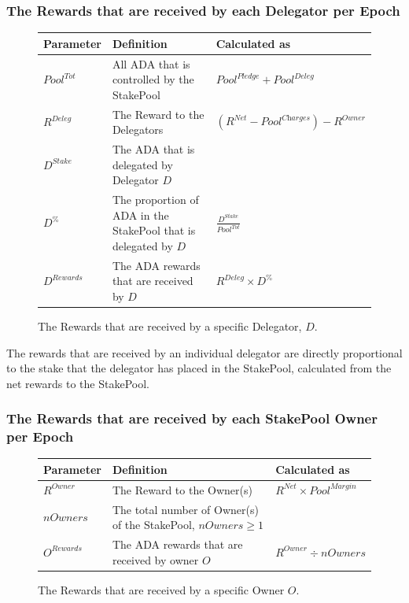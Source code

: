 \documentclass[11pt,a4paper,dvipsnames,twosided,final]{article}
\newcommand{\ada}{ADA{}}
\begin{document}
\subsubsection*{The Rewards that are received by each Delegator per Epoch}

\begin{figure}[h!]
\begin{center}
\begin{tabular}{||l|p{9cm}|l||}
  \hline \hline
\textbf{Parameter} & \textbf{Definition} & \textbf{Calculated as} \\\hline
${\textit{Pool}}^{Tot}$ & All \ada{} that is controlled by the StakePool & ${\textit{Pool}}^\textit{Pledge} + {\textit{Pool}}^\textit{Deleg}$ \\\hline
$R^{Deleg}$ & The Reward to the Delegators & $(R^{\textit{Net}}-\textit{Pool}^{\textit{Charges}}) - R^{Owner}$ \\\hline
$D^{Stake}$ & The \ada{} that is delegated by Delegator $D$ & \\\hline
$D^\%$ & The proportion of \ada{} in the StakePool that is delegated by $D$ & $\frac{D^{Stake}}{Pool^{Tot}}$ \\\hline
$D^{Rewards}$ & The \ada{} rewards that are received by $D$ & $R^{\textit{Deleg}} \times D^\%$ \\\hline
\hline
\end{tabular}
\end{center}
\caption{The Rewards that are received by a specific Delegator, $D$.}
\end{figure}

\noindent
The rewards that are received by an individual delegator are directly proportional to the
stake that the delegator has placed in the StakePool, calculated from the net rewards to the
StakePool.

\clearpage
\subsubsection*{The Rewards that are received by each StakePool Owner per Epoch}

\begin{figure}[h!]
\begin{center}
\begin{tabular}{||l|p{6cm}|l||}
  \hline \hline
\textbf{Parameter}  & \textbf{Definition} & \textbf{Calculated as} \\\hline
$R^\textit{Owner}$ & The Reward to the Owner(s) & $R^{\textit{Net}} \times {\textit{Pool}}^{\textit{Margin}} $ \\\hline
$\textit{nOwners}$ & The total number of Owner(s) of the StakePool, $\textit{nOwners} \ge 1$  & \\\hline
$O^{Rewards}$ & The \ada{} rewards that are received by owner $O$ & $R^\textit{Owner} \div \textit{nOwners}$ \\\hline
\hline
\end{tabular}
\end{center}
\caption{The Rewards that are received by a specific Owner $O$.}
\end{figure}
\end{document}
